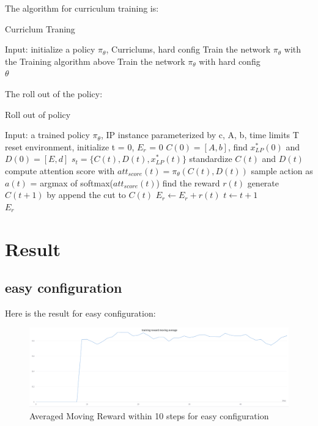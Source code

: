 \documentclass{article}
\begin{document}
The algorithm for curriculum training is:
\begin{algorithm}[H]
\caption{Curriclum Traning}\label{alg:cap}
\begin{algorithmic}[1]
\State Input: initialize a policy $\pi_\theta$, Curriclums, hard config 
\State Train the network $\pi_\theta$ with the Training algorithm above
\EndFor
\State Train the network $\pi_\theta$ with hard config \\
\Return $\theta$
\end{algorithmic}
\end{algorithm}

The roll out of the policy:
\begin{algorithm}[H]
\caption{Roll out of policy}\label{alg:cap}
\begin{algorithmic}[1]
\State Input: a trained policy $\pi_\theta$, IP instance parameterized by c, A, b, time limits T
\State reset environment, initialize t = 0, $E_r$ = 0
\State $C(0) = [A,b]$, find $x^*_{LP}(0)$ and $D(0) = [E,d]$
	\State $s_t = \{C(t), D(t), x^*_{LP}(t)\}$
	\State standardize $C(t)$ and $D(t)$
	\State compute attention score with $att_{score}(t) = \pi_\theta(C(t), D(t))$
	\State sample action as $a(t)$ = argmax of softmax($att_{score}(t)$) 
	\State find the reward $r(t)$
	\State generate $C(t+1)$ by append the cut to $C(t)$
	\State $E_r \gets E_r + r(t)$
	\State $t \gets t + 1$
\EndWhile \\
\Return $E_r$

\end{algorithmic}
\end{algorithm}


\section{Result}
\subsection{easy configuration}
Here is the result for easy configuration: 
\begin{figure}[h]
\centering
\includegraphics[width=1\textwidth]{easy_config.png}
\caption{Averaged Moving Reward within 10 steps for easy configuration}    
\end{figure} 
\end{document}
